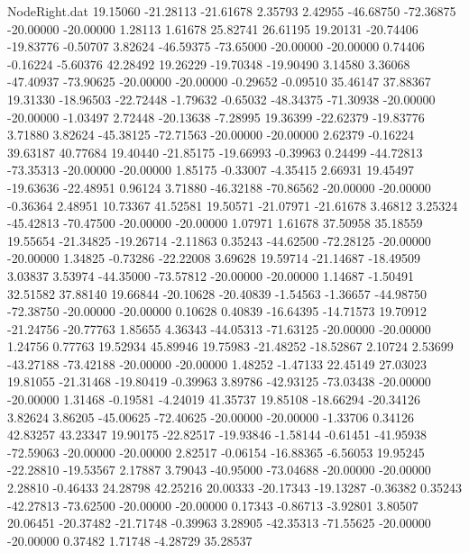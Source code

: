 \begin{filecontents}{NodeRight.dat}
  19.15060  -21.28113  -21.61678     2.35793    2.42955  -46.68750  -72.36875  -20.00000  -20.00000    1.28113    1.61678   25.82741   26.61195
  19.20131  -20.74406  -19.83776    -0.50707    3.82624  -46.59375  -73.65000  -20.00000  -20.00000    0.74406   -0.16224   -5.60376   42.28492
  19.26229  -19.70348  -19.90490     3.14580    3.36068  -47.40937  -73.90625  -20.00000  -20.00000   -0.29652   -0.09510   35.46147   37.88367
  19.31330  -18.96503  -22.72448    -1.79632   -0.65032  -48.34375  -71.30938  -20.00000  -20.00000   -1.03497    2.72448  -20.13638   -7.28995
  19.36399  -22.62379  -19.83776     3.71880    3.82624  -45.38125  -72.71563  -20.00000  -20.00000    2.62379   -0.16224   39.63187   40.77684
  19.40440  -21.85175  -19.66993    -0.39963    0.24499  -44.72813  -73.35313  -20.00000  -20.00000    1.85175   -0.33007   -4.35415    2.66931
  19.45497  -19.63636  -22.48951     0.96124    3.71880  -46.32188  -70.86562  -20.00000  -20.00000   -0.36364    2.48951   10.73367   41.52581
  19.50571  -21.07971  -21.61678     3.46812    3.25324  -45.42813  -70.47500  -20.00000  -20.00000    1.07971    1.61678   37.50958   35.18559
  19.55654  -21.34825  -19.26714    -2.11863    0.35243  -44.62500  -72.28125  -20.00000  -20.00000    1.34825   -0.73286  -22.22008    3.69628
  19.59714  -21.14687  -18.49509     3.03837    3.53974  -44.35000  -73.57812  -20.00000  -20.00000    1.14687   -1.50491   32.51582   37.88140
  19.66844  -20.10628  -20.40839    -1.54563   -1.36657  -44.98750  -72.38750  -20.00000  -20.00000    0.10628    0.40839  -16.64395  -14.71573
  19.70912  -21.24756  -20.77763     1.85655    4.36343  -44.05313  -71.63125  -20.00000  -20.00000    1.24756    0.77763   19.52934   45.89946
  19.75983  -21.48252  -18.52867     2.10724    2.53699  -43.27188  -73.42188  -20.00000  -20.00000    1.48252   -1.47133   22.45149   27.03023
  19.81055  -21.31468  -19.80419    -0.39963    3.89786  -42.93125  -73.03438  -20.00000  -20.00000    1.31468   -0.19581   -4.24019   41.35737
  19.85108  -18.66294  -20.34126     3.82624    3.86205  -45.00625  -72.40625  -20.00000  -20.00000   -1.33706    0.34126   42.83257   43.23347
  19.90175  -22.82517  -19.93846    -1.58144   -0.61451  -41.95938  -72.59063  -20.00000  -20.00000    2.82517   -0.06154  -16.88365   -6.56053
  19.95245  -22.28810  -19.53567     2.17887    3.79043  -40.95000  -73.04688  -20.00000  -20.00000    2.28810   -0.46433   24.28798   42.25216
  20.00333  -20.17343  -19.13287    -0.36382    0.35243  -42.27813  -73.62500  -20.00000  -20.00000    0.17343   -0.86713   -3.92801    3.80507
  20.06451  -20.37482  -21.71748    -0.39963    3.28905  -42.35313  -71.55625  -20.00000  -20.00000    0.37482    1.71748   -4.28729   35.28537

\end{filecontents}
